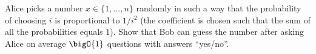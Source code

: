 Alice picks a number $x \in \{1, \dots, n\}$ randomly in such a way that the probability of choosing $i$
is proportional to $1 / i^2$ (the coefficient is chosen such that the sum of all the probabilities equals
$1$).  Show that Bob can guess the number after asking Alice on average $\bigO{1}$ questions with answers
``yes/no''.
